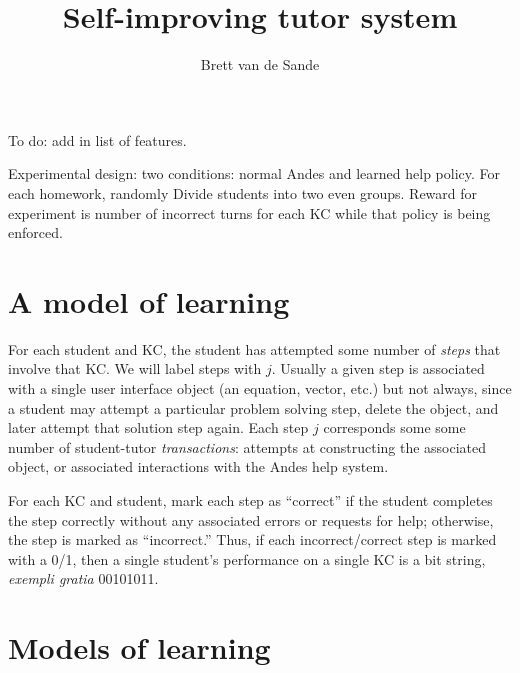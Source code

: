 \documentclass[11pt,letterpaper]{article}
\begin{document}
\title{Self-improving tutor system}
\author{Brett van de Sande}

%


\maketitle

To do:  add in list of features.

Experimental design:  two conditions: normal Andes and learned
help policy.  For each homework, randomly Divide students into two 
even groups.  Reward for experiment is number of incorrect turns
for each KC while that policy is being enforced.

\section{A model of learning}

For each student and KC, the student has attempted some number of 
{\em steps} that involve that KC.   We will label
steps with $j$.  Usually a given step is associated
with a single user interface object (an equation, vector, etc.)  but
not always, since a student may attempt a particular problem solving
step, delete the object, and later attempt that solution step again.
Each step $j$ corresponds some some number of student-tutor 
{\em transactions}: attempts at constructing the associated object, 
or associated interactions with the Andes help system.  

For each KC and student, mark each step as ``correct'' if
the student completes the step correctly without any associated errors or 
requests for help; otherwise, the step is marked as ``incorrect.''
%
Thus, if each incorrect/correct step is marked with a 0/1, then
a single student's performance on a single KC is a bit string,
{\em exempli gratia} 00101011.

\section{Models of learning}
\end{document}
